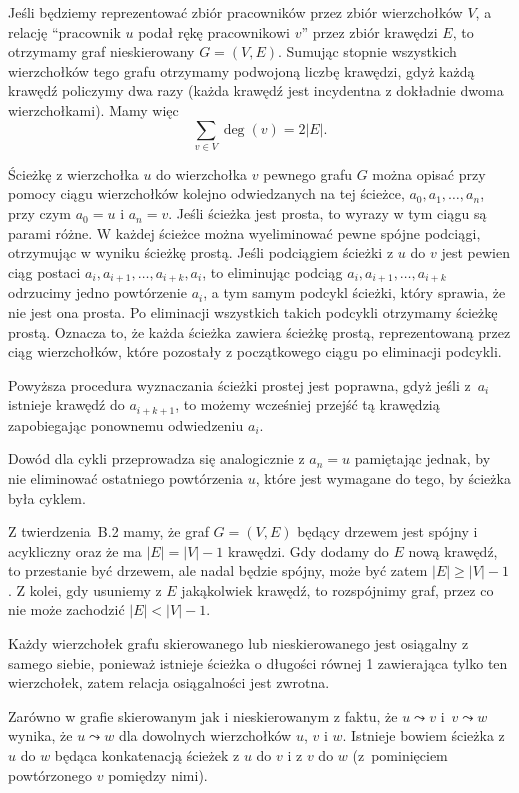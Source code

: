 
\exercise{} %
Jeśli będziemy reprezentować zbiór pracowników przez zbiór wierzchołków $V$, a relację ``pracownik $u$ podał rękę pracownikowi $v$'' przez zbiór krawędzi $E$, to otrzymamy graf nieskierowany $G=(V,E)$. Sumując stopnie wszystkich wierzchołków tego grafu otrzymamy podwojoną liczbę krawędzi, gdyż każdą krawędź policzymy dwa razy (każda krawędź jest incydentna z dokładnie dwoma wierzchołkami). Mamy więc
\[
	\sum_{v\in V}\deg(v) = 2|E|.
\]

\exercise{} %
Ścieżkę z wierzchołka $u$ do wierzchołka $v$ pewnego grafu $G$ można opisać przy pomocy ciągu wierzchołków kolejno odwiedzanych na tej ścieżce, $a_0,a_1,\dots,a_n$, przy czym $a_0=u$ i $a_n=v$. Jeśli ścieżka jest prosta, to wyrazy w tym ciągu są parami różne. W każdej ścieżce można wyeliminować pewne spójne podciągi, otrzymując w wyniku ścieżkę prostą. Jeśli podciągiem ścieżki z $u$ do $v$ jest pewien ciąg postaci $a_i,a_{i+1},\dots,a_{i+k},a_i$, to eliminując podciąg $a_i,a_{i+1},\dots,a_{i+k}$ odrzucimy jedno powtórzenie $a_i$, a tym samym podcykl ścieżki, który sprawia, że nie jest ona prosta. Po eliminacji wszystkich takich podcykli otrzymamy ścieżkę prostą. Oznacza to, że każda ścieżka zawiera ścieżkę prostą, reprezentowaną przez ciąg wierzchołków, które pozostały z początkowego ciągu po eliminacji podcykli.

Powyższa procedura wyznaczania ścieżki prostej jest poprawna, gdyż jeśli z~$a_i$ istnieje krawędź do $a_{i+k+1}$, to możemy wcześniej przejść tą krawędzią zapobiegając ponownemu odwiedzeniu $a_i$.

Dowód dla cykli przeprowadza się analogicznie z $a_n=u$ pamiętając jednak, by nie eliminować ostatniego powtórzenia $u$, które jest wymagane do tego, by ścieżka była cyklem.

\exercise{} %
Z twierdzenia~B.2 mamy, że graf $G=(V,E)$ będący drzewem jest spójny i acykliczny oraz że ma $|E|=|V|-1$ krawędzi. Gdy dodamy do $E$ nową krawędź, to przestanie być drzewem, ale nadal będzie spójny, może być zatem $|E|\ge|V|-1$. Z kolei, gdy usuniemy z $E$ jakąkolwiek krawędź, to rozspójnimy graf, przez co nie może zachodzić $|E|<|V|-1$.

\exercise{} %
Każdy wierzchołek grafu skierowanego lub nieskierowanego jest osiągalny z samego siebie, ponieważ istnieje ścieżka o długości równej 1 zawierająca tylko ten wierzchołek, zatem relacja osiągalności jest zwrotna.

Zarówno w grafie skierowanym jak i nieskierowanym z faktu, że $u\leadsto v$ i~$v\leadsto w$ wynika, że $u\leadsto w$ dla dowolnych wierzchołków $u$, $v$ i $w$. Istnieje bowiem ścieżka z $u$ do $w$ będąca konkatenacją ścieżek z $u$ do $v$ i z $v$ do $w$ (z~pominięciem powtórzonego $v$ pomiędzy nimi).

